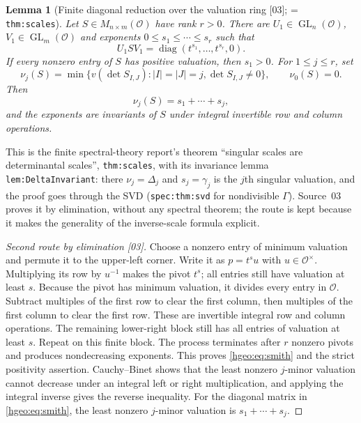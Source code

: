 \documentclass[11pt,letterpaper]{article}
\numberwithin{equation}{section}
\newtheorem{lemma}[lemma]{Lemma}
\theoremstyle{definition}
\theoremstyle{remark}
\newcommand{\OO}{\mathcal O}
\newcommand{\GL}{\operatorname{GL}}
\newcommand{\diag}{\operatorname{diag}}
\newcommand{\abs}[1]{\lvert #1\rvert}
\newcommand{\src}[1]{\textup{\textsf{\small[#1]}}}
\newcommand{\replabel}[1]{\nolinkurl{#1}}
\begin{document}
\begin{lemma}[Finite diagonal reduction over the valuation ring
\src{03}; = \replabel{thm:scales}]\label{hgeo:lem:smith}
Let $S\in M_{n\times m}(\OO)$ have rank $r>0$. There are
$U_1\in\GL_n(\OO)$, $V_1\in\GL_m(\OO)$ and exponents
$0\le s_1\le\cdots\le s_r$ such that
\begin{equation}\label{hgeo:eq:smith}
 U_1SV_1=\diag(t^{s_1},\ldots,t^{s_r},0).
\end{equation}
If every nonzero entry of $S$ has positive valuation, then $s_1>0$.
For $1\le j\le r$, set
\[
 \nu_j(S)=\min\{v(\det S_{I,J}):\abs I=\abs J=j,
                         \det S_{I,J}\ne0\},\qquad \nu_0(S)=0.
\]
Then
\begin{equation}\label{hgeo:eq:minors}
 \nu_j(S)=s_1+\cdots+s_j,
\end{equation}
and the exponents are invariants of $S$ under integral invertible row and
column operations.
\end{lemma}

This is the finite spectral-theory report's theorem ``singular scales are
determinantal scales'', \replabel{thm:scales}, with its invariance lemma
\replabel{lem:DeltaInvariant}: there $\nu_j=\Delta_j$ and $s_j=\gamma_j$ is the
$j$th singular valuation, and the proof goes through the SVD
(\replabel{spec:thm:svd} for nondivisible $\Gamma$). Source~03 proves it by
elimination, without any spectral theorem; the route is kept because it
makes the generality of the inverse-scale formula explicit.
\begin{proof}[Second route by elimination \src{03}]
Choose a nonzero entry of minimum valuation and permute it to the
upper-left corner. Write it as $p=t^s u$ with $u\in\OO^\times$.
Multiplying its row by $u^{-1}$ makes the pivot $t^s$; all entries
still have valuation at least $s$. Because the pivot has minimum
valuation, it divides every entry in $\OO$. Subtract multiples of
the first row to clear the first column, then multiples of the
first column to clear the first row. These are invertible integral
row and column operations. The remaining lower-right block still
has all entries of valuation at least $s$. Repeat on this finite block.
The process terminates after $r$ nonzero pivots and produces
nondecreasing exponents. This proves \eqref{hgeo:eq:smith} and the
strict positivity assertion. Cauchy--Binet shows that the least nonzero
$j$-minor valuation cannot decrease under an integral left or right
multiplication, and applying the integral inverse gives the reverse
inequality. For the diagonal matrix in \eqref{hgeo:eq:smith}, the least
nonzero $j$-minor valuation is $s_1+\cdots+s_j$.
\end{proof}
\end{document}
